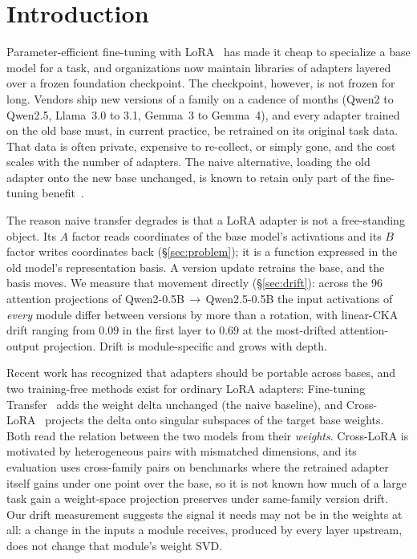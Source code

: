 \section{Introduction}
\label{sec:intro}

Parameter-efficient fine-tuning with LoRA~\citep{hu2022lora} has made it cheap
to specialize a base model for a task, and organizations now maintain libraries
of adapters layered over a frozen foundation checkpoint. The checkpoint,
however, is not frozen for long. Vendors ship new versions of a family on a
cadence of months (Qwen2 to Qwen2.5, Llama~3.0 to 3.1, Gemma~3 to Gemma~4), and
every adapter trained on the old base must, in current practice, be retrained
on its original task data. That data is often private, expensive to
re-collect, or simply gone, and the cost scales with the number of adapters.
The naive alternative, loading the old adapter onto the new base unchanged, is
known to retain only part of the fine-tuning benefit~\citep{lin2025finetuningtransfer}.

The reason naive transfer degrades is that a LoRA adapter is not a free-standing
object. Its $A$ factor reads coordinates of the base model's activations and its
$B$ factor writes coordinates back (\S\ref{sec:problem}); it is a function
expressed in the old model's representation basis. A version update retrains
the base, and the basis moves. We measure that movement directly
(\S\ref{sec:drift}): across the 96 attention projections of
Qwen2-0.5B\,$\to$\,Qwen2.5-0.5B the input activations of \emph{every} module
differ between versions by more than a rotation, with linear-CKA drift ranging
from $0.09$ in the first layer to $0.69$ at the most-drifted attention-output
projection. Drift is module-specific and grows with depth.

Recent work has recognized that adapters should be portable across bases, and
two training-free methods exist for ordinary LoRA adapters: Fine-tuning
Transfer~\citep{lin2025finetuningtransfer} adds the weight delta unchanged
(the naive baseline), and Cross-LoRA~\citep{xia2025crosslora} projects the delta
onto singular subspaces of the target base weights. Both read the relation
between the two models from their \emph{weights}. Cross-LoRA is motivated by
heterogeneous pairs with mismatched dimensions, and its evaluation uses
cross-family pairs on benchmarks where the retrained adapter itself gains
under one point over the base, so it is not known how much of a large task
gain a weight-space projection preserves under same-family version drift. Our
drift measurement suggests the signal it needs may not be in the weights at
all: a change in the inputs a module receives, produced by every layer
upstream, does not change that module's weight SVD.


